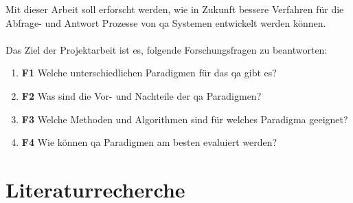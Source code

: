 \documentclass[
        ngerman,
        paper=a4,
        numbers=noendperiod,
]{scrreprt}
\begin{document}
Mit dieser Arbeit soll erforscht werden, wie in Zukunft bessere Verfahren für die Abfrage- und Antwort Prozesse von \ac{qa} Systemen entwickelt werden können.
\\
\\
Das Ziel der Projektarbeit ist es, folgende Forschungsfragen zu beantworten:

 \begin{enumerate}
    \item \textbf{F1} Welche unterschiedlichen Paradigmen für das \ac{qa} gibt es?
    \item \textbf{F2} Was sind die Vor- und Nachteile der \ac{qa} Paradigmen?
    \item \textbf{F3} Welche Methoden und Algorithmen sind für welches Paradigma geeignet?
    \item \textbf{F4} Wie können \ac{qa} Paradigmen am besten evaluiert werden?
  \end{enumerate}



\chapter{Literaturrecherche}
\end{document}
